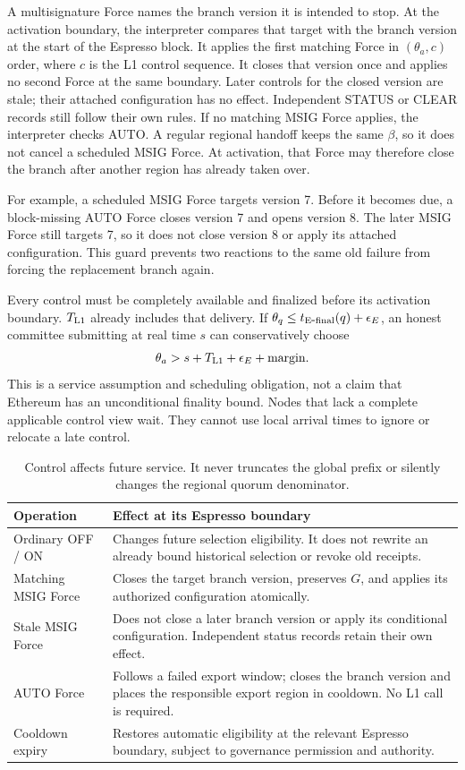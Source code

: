 \documentclass[11pt,a4paper]{article}
\begin{document}
A multisignature Force names the branch version it is intended to stop.
At the activation boundary, the interpreter compares that target with
the branch version at the start of the Espresso block. It applies the
first matching Force in $(\theta_a,c)$ order, where $c$ is the L1
control sequence. It closes that version once and applies no second
Force at the same boundary. Later controls for
the closed version are stale; their attached configuration has no effect.
Independent STATUS or CLEAR records still follow their own rules.
If no matching MSIG Force applies, the interpreter checks AUTO.
A regular regional handoff keeps the same $\beta$, so it does not
cancel a scheduled MSIG Force. At activation, that Force may therefore
close the branch after another region has already taken over.

For example, a scheduled MSIG Force targets version 7. Before it becomes
due, a block-missing AUTO Force closes version 7 and opens version 8.
The later MSIG Force still targets 7, so it does not close version 8 or
apply its attached configuration. This guard prevents two reactions to
the same old failure from forcing the replacement branch again.

Every control must be completely available and finalized before its
activation boundary. $T_{\rm L1}$ already includes that delivery.
If $\theta_q\le t_{\rm E\mbox{-}final}(q)+\epsilon_E$, an honest
committee submitting at real time $s$ can conservatively choose
\[
 \theta_a>s+T_{\rm L1}+\epsilon_E+\text{margin}.
\]
This is a service assumption and scheduling obligation, not a claim
that Ethereum has an unconditional finality bound. Nodes that lack a
complete applicable control view wait. They cannot use local arrival
times to ignore or relocate a late control.

\begin{table}[H]\centering\small
\begin{tabularx}{\linewidth}{@{}p{.24\linewidth}Y@{}}
\toprule Operation & Effect at its Espresso boundary\\\midrule
Ordinary OFF / ON & Changes future selection eligibility. It does not
rewrite an already bound historical selection or revoke old receipts.\\
Matching MSIG Force & Closes the target branch version, preserves $G$,
and applies its authorized configuration atomically.\\
Stale MSIG Force & Does not close a later branch version or apply its conditional
configuration. Independent status records retain their own effect.\\
AUTO Force & Follows a failed export window; closes the branch version and places
the responsible export region in cooldown. No L1 call is required.\\
Cooldown expiry & Restores automatic eligibility at the relevant
Espresso boundary, subject to governance permission and authority.\\\bottomrule
\end{tabularx}
\caption{Control affects future service. It never truncates the global
prefix or silently changes the regional quorum denominator.}
\end{table}
\end{document}

